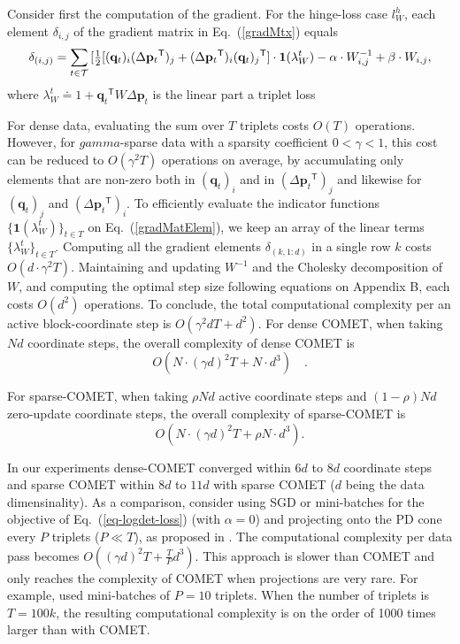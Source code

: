 \documentclass[twoside,11pt]{article}
\newcommand\mat[1]{{#1}}
\renewcommand\vec[1]{\mathbf{#1}}
\newcommand{\T}{{}^\mathsf{T}}
\newcommand{\W}{\mat{W}}
\newcommand{\eqdef}{\doteq}
\newcommand{\q}{{\vec{q}}}
\newcommand{\p}{{\vec{p}}}
\newcommand{\trip}{{t}}
\newcommand{\qt}{{\q_{\trip}}}
\renewcommand{\eqref}[1]{Eq.~(\ref{#1})}
\begin{document}
Consider first the computation of the gradient. For the hinge-loss case $l^{h}_W$, each element $\delta_{i,j}$ of the gradient matrix in \eqref{gradMtx} equals
\begin{equation}
    \delta_{(i,j)} = \sum\limits_{t\in \cal{T}}{ [\tfrac{1}{2}[(\vec{q}_{t})_i(\Delta\vec{p}_{t}\T)_j + (\Delta\vec{p}_{t}\T)_i(\vec{q}_{t})_j\T] } \cdot \textbf{1}(\lambda_{W}^t) - \alpha \cdot \W^{-1}_{i,j} + \beta \cdot \W_{i,j},
\label{gradMatElem}
\end{equation}
where $\lambda_{W}^t \eqdef 1+\qt\T \W \Delta\p_{t}$ is the linear part a triplet loss

For dense data, evaluating the sum over $T$ triplets costs $O(T)$ operations. However, for $gamma$-sparse data with a sparsity coefficient $ 0< \gamma <1 $, this cost can be reduced to $O(\gamma^2 T)$ operations on average, by accumulating only elements that are non-zero both in $(\vec{q}_{t})_i$ and in $(\Delta\vec{p}_{t}\T)_j$ and likewise for $(\vec{q}_{t})_j$ and $(\Delta\vec{p}_{t}\T)_i$.  To efficiently evaluate the indicator functions $\{ \textbf{1}(\lambda_{W}^t) \}_{t \in T}$ on \eqref{gradMatElem}, we keep an array of the linear terms $\{\lambda_{W}^t\}_{t \in T}$. Computing all the gradient elements $\delta_{(k,1:d)}$ in a single row $k$ costs $O(d\cdot \gamma^2 T)$.
Maintaining and updating $\W^{-1}$ and the Cholesky decomposition of $\W$, and computing the optimal step size following equations on Appendix B, each costs $O(d^2)$ operations. To conclude, the total computational complexity per an active block-coordinate step is $O(\gamma^2 d T + d^2)$. 
For dense COMET, when taking $Nd$ coordinate steps, the overall complexity of dense COMET is 
\begin{equation}
    O(N \cdot (\gamma d)^2 T + N \cdot d^3) \quad.
    \label{cometComplexity}
\end{equation}

For sparse-COMET, when taking $\rho N d$ active coordinate steps and $(1-\rho) Nd$ zero-update coordinate steps, the overall complexity of sparse-COMET is
\begin{equation}
     O(N \cdot (\gamma d)^2 T + \rho N \cdot d^3).
     \label{spcometComplexity}
\end{equation}

In our experiments dense-COMET converged within $6 d$ to $8 d$ coordinate steps and sparse COMET within $8 d$ to $11 d$ with sparse COMET ($d$ being the data dimensinality). As a comparison, consider using SGD or mini-batches for the objective of \eqref{eq-logdet-loss} (with $\alpha = 0$) and projecting onto the PD cone every $P$ triplets ($P \ll T$), as proposed in \citet{OASIS,qian}. The computational complexity per data pass becomes $O((\gamma d)^2 T + \frac{T}{P} d^3)$. This approach is slower than COMET and only reaches the complexity of COMET when projections are very rare. For example, \citet{qian} used mini-batches of $P=10$ triplets. When the number of triplets is $T=100k$, the resulting computational complexity is on the order of 1000 times larger than with COMET.
\end{document}
